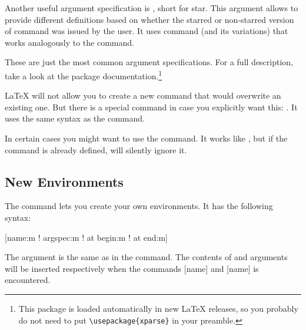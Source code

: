 Another useful argument specification is , short for star. This
argument allows to provide different definitions based on whether the
starred or non-starred version of command was issued by the user. It uses
 command (and its variations)
that works analogously to the  command. 

\begin{chktexignore}
\end{chktexignore}

These are just the most common argument specifications. For a full description,
take a look at the  package documentation.\footnote{This
package is loaded automatically in new \LaTeX{} releases, so you probably do not
need to put \texttt{\textbackslash{}usepackage\{xparse\}} in your preamble. }

\LaTeX{} will not allow you to create a new command that would
overwrite an existing one. But there is a special command in case you
explicitly want this: .
It uses the same syntax as the 
command.

In certain cases you might want to use the 
command. It works like , but if the command is
already defined, \LaTeXe{} will silently ignore it.

\subsection{New Environments}
The  command lets you create your own environments. It has the
following syntax:

\begin{lscommand}
[name:m ! argspec:m ! at begin:m ! at end:m]
\end{lscommand}
The  argument is the same as in the
 command. The contents of  and  arguments will be inserted respectively when the commands
[name] and [name] is encountered.

